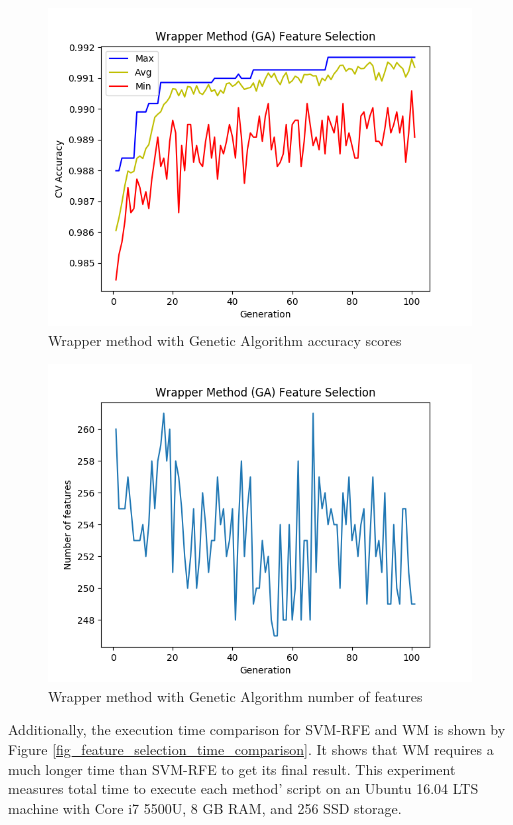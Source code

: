 \documentclass[conference]{IEEEtran}
\begin{document}
\begin{figure}
	\includegraphics[scale=0.5]{../images/WM_GA_SVM_acc_chart.png}
	\caption{Wrapper method with Genetic Algorithm accuracy scores}
	\label{fig_wm_acc_chart}
\end{figure}

\begin{figure}
	\includegraphics[scale=0.5]{../images/WM_GA_SVM_feat_chart.png}
	\caption{Wrapper method with Genetic Algorithm number of features}
	\label{fig_wm_num_features_chart}
\end{figure}

Additionally, the execution time comparison for SVM-RFE and WM is shown by Figure \ref{fig_feature_selection_time_comparison}. It shows that WM requires a much longer time than SVM-RFE to get its final result. This experiment measures total time to execute each method' script on an Ubuntu 16.04 LTS machine with Core i7 5500U, 8 GB RAM, and 256 SSD storage.
\end{document}
